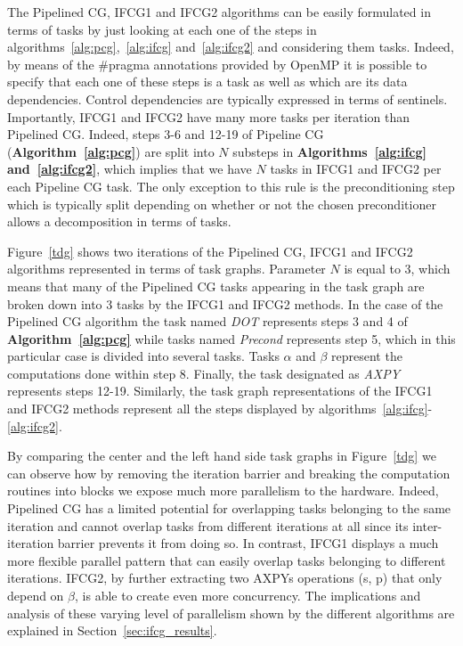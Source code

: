The Pipelined CG, IFCG1 and IFCG2 algorithms can be easily formulated in terms of tasks by just looking at each one of the steps in algorithms~\ref{alg:pcg},~\ref{alg:ifcg} and~\ref{alg:ifcg2} and considering them tasks. 
Indeed, by means of the \#pragma annotations provided by OpenMP it is possible to specify that each one of these steps is a task as well as which are its data dependencies.
Control dependencies are typically expressed in terms of sentinels.
Importantly, IFCG1 and IFCG2 have many more tasks per iteration than Pipelined CG.
Indeed, steps 3-6 and 12-19 of Pipeline CG ({\bf Algorithm~\ref{alg:pcg}}) 
are split into $N$ substeps in {\bf Algorithms~\ref{alg:ifcg} and~\ref{alg:ifcg2}}, which implies that we have $N$ tasks in IFCG1 and IFCG2 per each Pipeline CG task.  
The only exception to this rule is the preconditioning step which is typically split depending on whether or not the chosen preconditioner allows a decomposition in terms of tasks.

Figure~\ref{tdg} shows two iterations of the Pipelined CG, IFCG1 and IFCG2 algorithms represented in terms of task graphs.
Parameter $N$ is equal to $3$, which means that many of the Pipelined CG tasks appearing in the task graph are broken down
into 3 tasks by the IFCG1 and IFCG2 methods.
In the case of the Pipelined CG algorithm the task named \emph{DOT} represents steps 3 and 4 of {\bf Algorithm~\ref{alg:pcg}} while tasks named \emph{Precond} represents step 5, which in this particular case is divided into several tasks. 
Tasks $\alpha$ and $\beta$ represent the computations done within step 8.
Finally, the task designated as \emph{AXPY} represents steps 12-19.
Similarly, the task graph representations of the IFCG1 and IFCG2 methods represent all the steps displayed by algorithms~\ref{alg:ifcg}-\ref{alg:ifcg2}.

By comparing the center and the left hand side task graphs in Figure~\ref{tdg} we can observe how by removing the iteration barrier and breaking the computation routines into 
blocks we expose much more parallelism to the hardware. 
Indeed, Pipelined CG has a limited potential for overlapping tasks belonging to the same iteration and cannot overlap tasks from different iterations at all since its inter-iteration barrier prevents it from doing so.
In contrast, IFCG1 displays a much more flexible parallel pattern that can easily overlap tasks belonging to different iterations.
IFCG2, by further extracting two AXPYs operations (s, p) that only depend on $\beta$, is able to create even more concurrency.
The implications and analysis of these varying level of parallelism shown by the different algorithms are explained in Section~\ref{sec:ifcg_results}.

